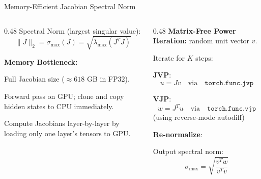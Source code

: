 \documentclass[10pt,aspectratio=169]{beamer}
\begin{document}
\begin{frame}{Memory-Efficient Jacobian Spectral Norm}
  \begin{columns}
    \begin{column}{0.48\textwidth}
        Spectral Norm (largest singular value):
          \begin{equation*}
            \|J\|_2 = \sigma_{\max}(J) = \sqrt{\lambda_{\max}(J^T J)}
          \end{equation*}
      
      \textbf{Memory Bottleneck:}

      Full Jacobian size ($\approx 618$ GB in FP32).

      Forward pass on GPU; clone and copy hidden states to CPU immediately.

      Compute Jacobians layer-by-layer by loading only one layer's tensors to GPU.
    \end{column}
    \begin{column}{0.48\textwidth}
      \textbf{Matrix-Free Power Iteration:}
      random unit vector $v$.

      Iterate for $K$ steps:

      \textbf{JVP}:
        \begin{equation*}
          u = J v \quad \text{via} \quad \texttt{torch.func.jvp}
        \end{equation*}

      \textbf{VJP}:
        \begin{equation*}
          w = J^T u \quad \text{via} \quad \texttt{torch.func.vjp}
        \end{equation*}
        (using reverse-mode autodiff)

      \textbf{Re-normalize}:

      Output spectral norm:
          \begin{equation*}
            \sigma_{\max} = \sqrt{\frac{v^T w}{v^T v}}
          \end{equation*}
    \end{column}
  \end{columns}
\end{frame}
\end{document}
